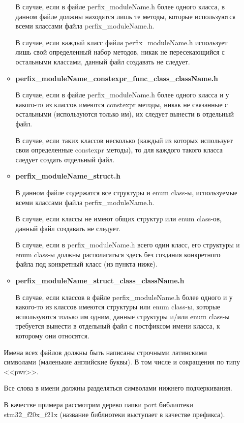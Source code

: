 \begin{enumerate}
\begin{itemize}
		В случае, если в файле perfix\_moduleName.h более одного класса, в данном файле должны находятся лишь те методы, которые используются всеми классами файла perfix\_moduleName.h.
		
		В случае, если каждый класс файла perfix\_moduleName.h использует лишь свой определенный набор методов, никак не пересекающийся с остальными классами, данный файл создавать не следует.
		\item \textbf{perfix\_moduleName\_constexpr\_func\_class\_className.h}
		
		В случае, если в файле perfix\_moduleName.h более одного класса и у какого-то из классов имеются constexpr методы, никак не связанные с остальными (используются только им), их следует вынести в отдельный файл. 
		
		В случае, если таких классов несколько (каждый из которых использует свои определенные constexpr методы), то для каждого такого класса следует создать отдельный файл.
		\item \textbf{perfix\_moduleName\_struct.h}
		
		В данном файле содержатся все структуры и enum class-ы, используемые всеми классами файла perfix\_moduleName.h.
		
		В случае, если классы не имеют общих структур или enum class-ов, данный файл создавать не следует.
		
		В случае, если в perfix\_moduleName.h всего один класс, его структуры и enum class-ы должны располагаться здесь без создания конкретного файла под конкретный класс (из пункта ниже).
		\item \textbf{perfix\_moduleName\_struct\_class\_className.h}
		
		В случае, если классов в файле perfix\_moduleName.h более одного и у какого-то из классов имеются структуры или enum class-ы, которые используются только им одним, данные структуры и/или enum class-ы требуется вынести в отдельный файл с постфиксом имени класса, к которому они относятся.
	\end{itemize}

	Имена всех файлов должны быть написаны строчными латинскими символами (маленькие английские буквы). В том числе и сокращения по типу <<pwr>>.
	
	Все слова в имени должны разделяться символами нижнего подчеркивания. 
	
	В качестве примера рассмотрим дерево папки port библиотеки stm32\_f20x\_f21x (название библиотеки выступает в качестве префикса).
	

\end{enumerate}
